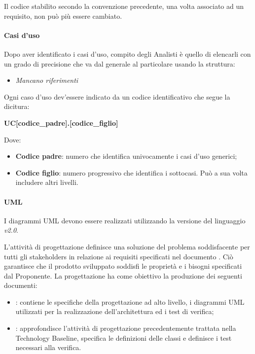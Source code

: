                     Il codice stabilito secondo la convenzione precedente, una volta associato ad un requisito, non può più essere cambiato.
                    
                \paragraph{Casi d'uso}
                                Dopo aver identificato i casi d'uso, compito degli Analisti è quello di elencarli con un grado di precisione che va dal generale al particolare usando la struttura:
                \begin{itemize}
                \item{\textit{Mancano riferimenti}}
                \end{itemize}

                Ogni caso d'uso dev'essere indicato da un codice identificativo che segue la dicitura: 
                \begin{center}
                \textbf{UC[codice\_padre].[codice\_figlio]}
                \end{center}
                
                Dove:
                \begin{itemize}
                 	\item{\textbf{Codice padre}: numero che identifica univocamente i casi d'uso generici;}
			\item{\textbf{Codice figlio}: numero progressivo che identifica i sottocasi. Può a sua volta includere altri livelli.}
                \end{itemize}
                                
                \paragraph{UML}
                I diagrammi UML devono essere realizzati utilizzando la versione del linguaggio \textit{v2.0}.
                
            L'attività di progettazione definisce una soluzione del problema soddisfacente per tutti gli stakeholders in relazione ai requisiti specificati nel documento \AdR{}. Ciò garantisce che il prodotto sviluppato soddisfi le proprietà e i bisogni specificati dal Proponente. 
            La progettazione ha come obiettivo la produzione dei seguenti documenti:
            \begin{itemize}
            	\item{\textbf{\TB}: contiene le specifiche della progettazione ad alto livello, i diagrammi UML utilizzati per la realizzazione dell'architettura ed i test di verifica;}
		\item{\textbf{\PB}: approfondisce l'attività di progettazione precedentemente trattata nella Technology Baseline, specifica le definizioni delle classi e definisce i test necessari alla verifica.}
	     \end{itemize}
	     
